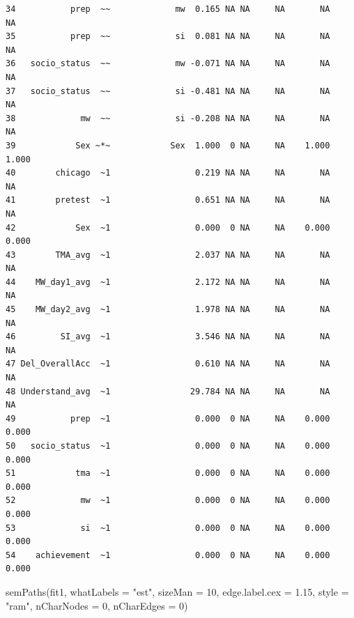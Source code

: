 \documentclass[
  letterpaper,
  DIV=11,
  numbers=noendperiod]{scrartcl}
\newenvironment{Shaded}{\begin{snugshade}}{\end{snugshade}}
\newcommand{\AttributeTok}[1]{\textcolor[rgb]{0.40,0.45,0.13}{#1}}
\newcommand{\DecValTok}[1]{\textcolor[rgb]{0.68,0.00,0.00}{#1}}
\newcommand{\FloatTok}[1]{\textcolor[rgb]{0.68,0.00,0.00}{#1}}
\newcommand{\FunctionTok}[1]{\textcolor[rgb]{0.28,0.35,0.67}{#1}}
\newcommand{\NormalTok}[1]{\textcolor[rgb]{0.00,0.23,0.31}{#1}}
\newcommand{\StringTok}[1]{\textcolor[rgb]{0.13,0.47,0.30}{#1}}
\begin{document}
\begin{verbatim}
34           prep  ~~             mw  0.165 NA NA     NA       NA       NA
35           prep  ~~             si  0.081 NA NA     NA       NA       NA
36   socio_status  ~~             mw -0.071 NA NA     NA       NA       NA
37   socio_status  ~~             si -0.481 NA NA     NA       NA       NA
38             mw  ~~             si -0.208 NA NA     NA       NA       NA
39            Sex ~*~            Sex  1.000  0 NA     NA    1.000    1.000
40        chicago  ~1                 0.219 NA NA     NA       NA       NA
41        pretest  ~1                 0.651 NA NA     NA       NA       NA
42            Sex  ~1                 0.000  0 NA     NA    0.000    0.000
43        TMA_avg  ~1                 2.037 NA NA     NA       NA       NA
44    MW_day1_avg  ~1                 2.172 NA NA     NA       NA       NA
45    MW_day2_avg  ~1                 1.978 NA NA     NA       NA       NA
46         SI_avg  ~1                 3.546 NA NA     NA       NA       NA
47 Del_OverallAcc  ~1                 0.610 NA NA     NA       NA       NA
48 Understand_avg  ~1                29.784 NA NA     NA       NA       NA
49           prep  ~1                 0.000  0 NA     NA    0.000    0.000
50   socio_status  ~1                 0.000  0 NA     NA    0.000    0.000
51            tma  ~1                 0.000  0 NA     NA    0.000    0.000
52             mw  ~1                 0.000  0 NA     NA    0.000    0.000
53             si  ~1                 0.000  0 NA     NA    0.000    0.000
54    achievement  ~1                 0.000  0 NA     NA    0.000    0.000
\end{verbatim}

\begin{Shaded}
\begin{Highlighting}[]
\FunctionTok{semPaths}\NormalTok{(fit1,}
           \AttributeTok{whatLabels =} \StringTok{"est"}\NormalTok{,}
           \AttributeTok{sizeMan =} \DecValTok{10}\NormalTok{,}
           \AttributeTok{edge.label.cex =} \FloatTok{1.15}\NormalTok{,}
           \AttributeTok{style =} \StringTok{"ram"}\NormalTok{,}
           \AttributeTok{nCharNodes =} \DecValTok{0}\NormalTok{, }\AttributeTok{nCharEdges =} \DecValTok{0}\NormalTok{)}
\end{Highlighting}
\end{Shaded}
\end{document}
